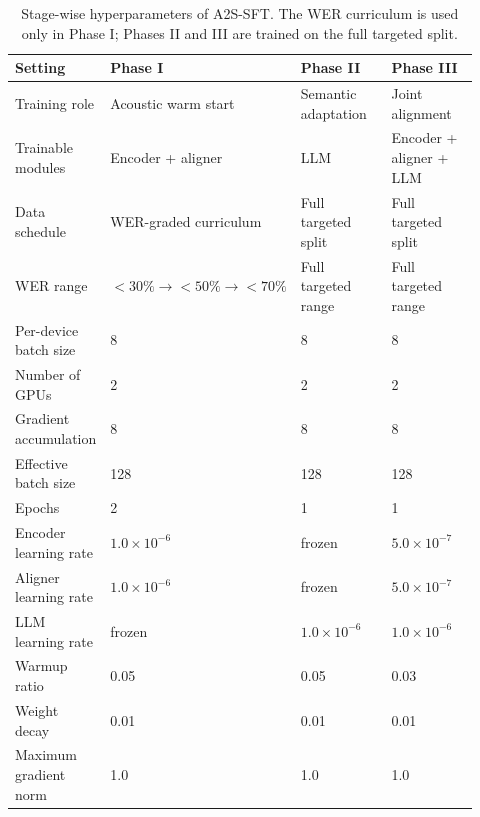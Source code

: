 \documentclass{article}
\begin{document}
\begin{table}[t]
\centering
\small
\caption{
Stage-wise hyperparameters of A2S-SFT. The WER curriculum is used only in
Phase I; Phases II and III are trained on the full targeted split.
}
\label{tab:a2s_sft_stage_hparams}
\renewcommand{\arraystretch}{1.13}
\begin{tabular}{p{0.20\linewidth} p{0.24\linewidth} p{0.24\linewidth} p{0.24\linewidth}}
\toprule
\textbf{Setting}
& \textbf{Phase I}
& \textbf{Phase II}
& \textbf{Phase III} \\
\midrule

Training role
& Acoustic warm start
& Semantic adaptation
& Joint alignment \\

Trainable modules
& Encoder + aligner
& LLM
& Encoder + aligner + LLM \\

Data schedule
& WER-graded curriculum
& Full targeted split
& Full targeted split \\

WER range
& $<30\% \rightarrow <50\% \rightarrow <70\%$
& Full targeted range
& Full targeted range \\

Per-device batch size
& 8
& 8
& 8 \\

Number of GPUs
& 2
& 2
& 2 \\

Gradient accumulation
& 8
& 8
& 8 \\

Effective batch size
& 128
& 128
& 128 \\

Epochs
& 2
& 1
& 1 \\

Encoder learning rate
& $1.0 \times 10^{-6}$
& frozen
& $5.0 \times 10^{-7}$ \\

Aligner learning rate
& $1.0 \times 10^{-6}$
& frozen
& $5.0 \times 10^{-7}$ \\

LLM learning rate
& frozen
& $1.0 \times 10^{-6}$
& $1.0 \times 10^{-6}$ \\

Warmup ratio
& 0.05
& 0.05
& 0.03 \\

Weight decay
& 0.01
& 0.01
& 0.01 \\

Maximum gradient norm
& 1.0
& 1.0
& 1.0 \\


\end{tabular}
\end{table}
\end{document}
